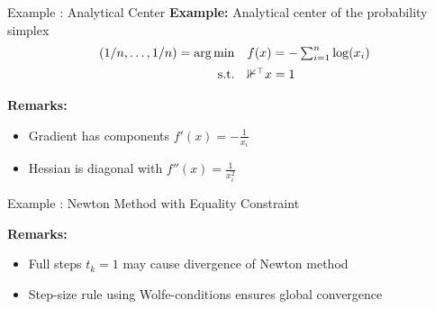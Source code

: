 \documentclass[9pt]{beamer}
\begin{document}
\begin{frame}{Example : Analytical Center}
  \textbf{Example:} Analytical center of the probability simplex
  \[
    \begin{array}{rl}
      (1/n, \dots, 1/n)= \arg\min & f(x)=-\sum_{i=1}^n \log(x_i) \\[0.5em]
      \mathrm{s.t.} & \mathbb 1^\top x = 1
    \end{array}
  \]

  \vfill

  \textbf{Remarks:}
  \begin{itemize}
  \item Gradient has components
    \(
      f'(x) = -\tfrac{1}{x_i}
    \)
  \item Hessian is diagonal with
    \(
      f''(x) = \tfrac{1}{x_i^2}
    \)
  \end{itemize}

\end{frame}

\begin{frame}{Example : Newton Method with Equality Constraint}
  
  \begin{algorithm}[H]
    \caption{\emph{Full-Newton Method}}
  \end{algorithm}

  \vfill

  \textbf{Remarks:}
  \begin{itemize}
  \item Full steps $t_k=1$ may cause divergence of Newton method
  \item Step-size rule using Wolfe-conditions ensures global convergence
  \end{itemize}
  
\end{frame}
\end{document}
